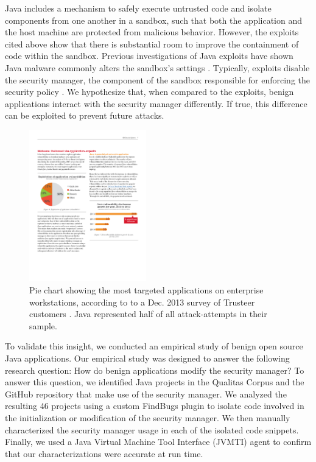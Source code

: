 \documentclass{sig-alternate}
\begin{document}
Java includes a mechanism to safely execute untrusted code and isolate
components from one another in a sandbox, such that both the application
and the host machine are protected from malicious behavior. However,
the exploits cited above show that there is substantial room to improve
the containment of code within the sandbox. Previous investigations
of Java exploits have shown Java malware commonly alters the sandbox's
settings \cite{garber_2012}. Typically, exploits disable the security
manager, the component of the sandbox responsible for enforcing the
security policy \cite{fireeye_2013,svoboda_anatomy_blog_2013,security_explorations_2012,blackhat_2012}.
We hypothesize that, when compared to the exploits, benign applications
interact with the security manager differently. If true, this difference
can be exploited to prevent future attacks.

\begin{figure}
\begin{centering}
\includegraphics[width=2in]{most_targeted_apps_ibm_xforce}
\par\end{centering}

\caption{Pie chart showing the most
targeted applications on enterprise workstations, according to to
a Dec. 2013 survey of Trusteer customers \cite{xforceQ12013}. Java
represented half of all attack-attempts in their sample.}
\label{fig:most-targeted-applications}
\end{figure}

To validate this insight, we conducted an empirical study of benign
open source Java applications. Our empirical study was designed to
answer the following research question: How do benign applications
modify the security manager? To answer this question, we identified
Java projects in the Qualitas Corpus \cite{QualitasCorpus:APSEC:2010}
and the GitHub repository that make use of the security manager. We
analyzed the resulting 46 projects using a custom FindBugs \cite{hovemeyer_finding_2004}
plugin to isolate code involved in the initialization or modification
of the security manager. We then manually characterized the security
manager usage in each of the isolated code snippets. Finally, we used
a Java Virtual Machine Tool Interface (JVMTI) agent to confirm that
our characterizations were accurate at run time. 
\end{document}
